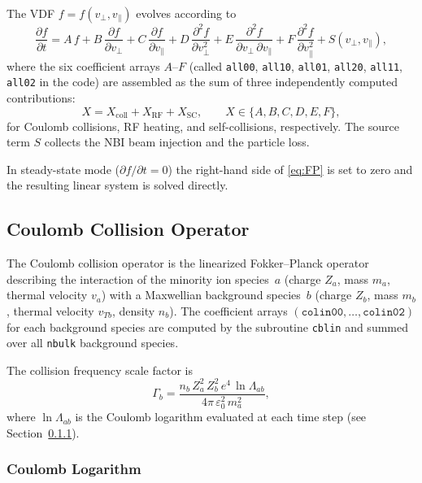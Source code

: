 \documentclass[11pt,a4paper]{article}
\newcommand{\vp}{v_\perp}
\newcommand{\vpa}{v_\parallel}
\newcommand{\fvdf}{f(\vp,\vpa)}
\begin{document}
The VDF $f = \fvdf$ evolves according to
\begin{equation}
\label{eq:FP}
  \frac{\partial f}{\partial t} =
    A\,f
  + B\,\frac{\partial f}{\partial \vp}
  + C\,\frac{\partial f}{\partial \vpa}
  + D\,\frac{\partial^2 f}{\partial \vp^2}
  + E\,\frac{\partial^2 f}{\partial \vp\,\partial \vpa}
  + F\,\frac{\partial^2 f}{\partial \vpa^2}
  + S(\vp,\vpa),
\end{equation}
where the six coefficient arrays $A$--$F$ (called \texttt{all00}, \texttt{all10},
\texttt{all01}, \texttt{all20}, \texttt{all11}, \texttt{all02} in the code) are
assembled as the sum of three independently computed contributions:
\begin{equation}
  X = X_{\mathrm{coll}} + X_{\mathrm{RF}} + X_{\mathrm{SC}},
  \qquad X \in \{A,B,C,D,E,F\},
\end{equation}
for Coulomb collisions, RF heating, and self-collisions, respectively.
The source term $S$ collects the NBI beam injection and the particle loss.

In steady-state mode ($\partial f/\partial t = 0$) the right-hand side of
\eqref{eq:FP} is set to zero and the resulting linear system is solved
directly.

\subsection{Coulomb Collision Operator}

The Coulomb collision operator is the linearized Fokker--Planck operator
describing the interaction of the minority ion species~$a$ (charge $Z_a$,
mass $m_a$, thermal velocity $v_a$) with a Maxwellian background species~$b$
(charge $Z_b$, mass $m_b$, thermal velocity $v_{Tb}$, density $n_b$).
The coefficient arrays $(\texttt{colin00}, \ldots, \texttt{colin02})$ for
each background species are computed by the subroutine \texttt{cblin} and
summed over all \texttt{nbulk} background species.

The collision frequency scale factor is
\begin{equation}
  \Gamma_b = \frac{n_b\,Z_a^2\,Z_b^2\,e^4\,\ln\Lambda_{ab}}
                  {4\pi\,\varepsilon_0^2\,m_a^2},
\end{equation}
where $\ln\Lambda_{ab}$ is the Coulomb logarithm evaluated at each time step
(see Section~\ref{sec:coulomb_log}).

\subsubsection{Coulomb Logarithm}\label{sec:coulomb_log}
\end{document}
